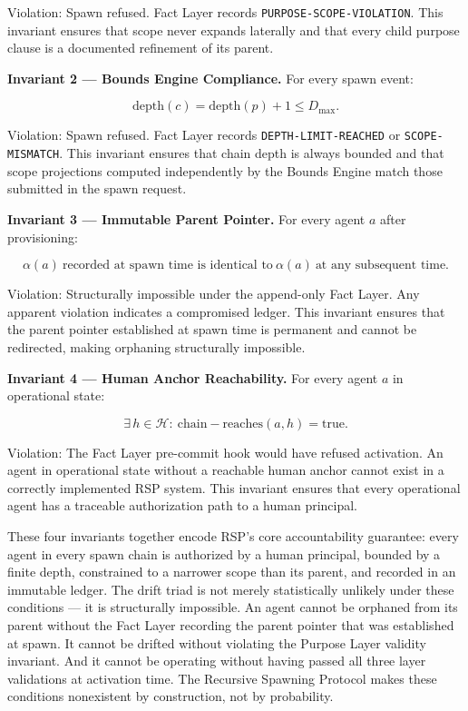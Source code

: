 Violation: Spawn refused. Fact Layer records \texttt{PURPOSE-SCOPE-VIOLATION}. This invariant ensures that scope never expands laterally and that every child purpose clause is a documented refinement of its parent.

\bigskip
\noindent\textbf{Invariant 2 — Bounds Engine Compliance.} For every spawn event:

\begin{equation}
\mathrm{depth}(c) = \mathrm{depth}(p) + 1 \leq D_{\max}.
\label{eq:rs-inv-bounds}
\end{equation}

Violation: Spawn refused. Fact Layer records \texttt{DEPTH-LIMIT-REACHED} or \texttt{SCOPE-MISMATCH}. This invariant ensures that chain depth is always bounded and that scope projections computed independently by the Bounds Engine match those submitted in the spawn request.

\bigskip
\noindent\textbf{Invariant 3 — Immutable Parent Pointer.} For every agent $a$ after provisioning:

\begin{equation}
\alpha(a)\ \text{recorded at spawn time is identical to}\ \alpha(a)\ \text{at any subsequent time}.
\label{eq:rs-inv-parent}
\end{equation}

Violation: Structurally impossible under the append-only Fact Layer. Any apparent violation indicates a compromised ledger. This invariant ensures that the parent pointer established at spawn time is permanent and cannot be redirected, making orphaning structurally impossible.

\bigskip
\noindent\textbf{Invariant 4 — Human Anchor Reachability.} For every agent $a$ in operational state:

\begin{equation}
\exists\, h \in \mathcal{H}:\ \mathrm{chain-reaches}(a, h) = \mathrm{true}.
\label{eq:rs-inv-anchor}
\end{equation}

Violation: The Fact Layer pre-commit hook would have refused activation. An agent in operational state without a reachable human anchor cannot exist in a correctly implemented RSP system. This invariant ensures that every operational agent has a traceable authorization path to a human principal.

\bigskip
These four invariants together encode RSP's core accountability guarantee: every agent in every spawn chain is authorized by a human principal, bounded by a finite depth, constrained to a narrower scope than its parent, and recorded in an immutable ledger. The drift triad is not merely statistically unlikely under these conditions — it is structurally impossible. An agent cannot be orphaned from its parent without the Fact Layer recording the parent pointer that was established at spawn. It cannot be drifted without violating the Purpose Layer validity invariant. And it cannot be operating without having passed all three layer validations at activation time. The Recursive Spawning Protocol makes these conditions nonexistent by construction, not by probability.